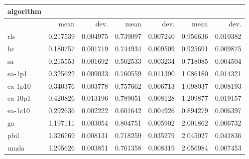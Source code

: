 \begin{tabular}{@{}l*{6}{>{{}}N{1}{2}}@{}}
\toprule
{algorithm} &  &  &  \\
\midrule
& {mean} & {dev.} & {mean} & {dev.} & {mean} & {dev.} \\
\midrule
rls & 0.217539 & 0.004975 & 0.739097 & 0.007240 & 0.956636 & 0.010382 \\
 hc & 0.180757 & 0.001719 & 0.744934 & 0.009509 & 0.925691 & 0.009875 \\
 sa & 0.215553 & 0.001692 & 0.502533 & 0.003234 & 0.718085 & 0.004504 \\
 ea-1p1 & 0.325622 & 0.009033 & 0.760559 & 0.011390 & 1.086180 & 0.014321 \\
 ea-1p10 & 0.340376 & 0.003778 & 0.757662 & 0.006713 & 1.098037 & 0.008193 \\
 ea-10p1 & 0.420826 & 0.013196 & 0.789051 & 0.008128 & 1.209877 & 0.019157 \\
 ea-1c10 & 0.292636 & 0.002222 & 0.601642 & 0.004926 & 0.894279 & 0.006397 \\
 ga & 1.197111 & 0.003054 & 0.804751 & 0.005902 & 2.001862 & 0.006732 \\
 pbil & 1.326769 & 0.008131 & 0.718259 & 0.035279 & 2.045027 & 0.041836 \\
 umda & 1.295626 & 0.003851 & 0.761358 & 0.008319 & 2.056984 & 0.007453 \\
 \bottomrule
\end{tabular}

